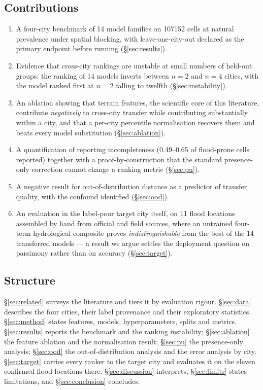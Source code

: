 \documentclass[11pt]{article}
\begin{document}
\subsection{Contributions}
\begin{enumerate}\itemsep2pt
  \item A four-city benchmark of \num{14} model families on \num{107152} cells at
    natural prevalence under spatial blocking, with leave-one-city-out declared
    as the primary endpoint before running (\S\ref{sec:results}).
  \item Evidence that cross-city rankings are unstable at small numbers of held-out
    groups: the ranking of \num{14} models inverts between $n{=}2$ and $n{=}4$
    cities, with the model ranked first at $n{=}2$ falling to twelfth
    (\S\ref{sec:instability}).
  \item An ablation showing that terrain features, the scientific core of this
    literature, contribute \emph{negatively} to cross-city transfer while
    contributing substantially within a city, and that a per-city percentile
    normalisation recovers them and beats every model substitution
    (\S\ref{sec:ablation}).
  \item A quantification of reporting incompleteness (\numrange{0.49}{0.65} of
    flood-prone cells reported) together with a proof-by-construction that the
    standard presence-only correction cannot change a ranking metric
    (\S\ref{sec:pu}).
  \item A negative result for out-of-distribution distance as a predictor of
    transfer quality, with the confound identified (\S\ref{sec:ood}).
  \item An evaluation in the label-poor target city itself, on \num{11} flood
    locations assembled by hand from official and field sources, where an
    untrained four-term hydrological composite proves \emph{indistinguishable}
    from the best of the \num{14} transferred models --- a result we argue
    settles the deployment question on parsimony rather than on accuracy
    (\S\ref{sec:target}).
\end{enumerate}

\subsection{Structure}
\S\ref{sec:related} surveys the literature and tiers it by evaluation rigour.
\S\ref{sec:data} describes the four cities, their label provenance and their
exploratory statistics. \S\ref{sec:method} states features, models,
hyperparameters, splits and metrics. \S\ref{sec:results} reports the benchmark
and the ranking instability; \S\ref{sec:ablation} the feature ablation and the
normalisation result; \S\ref{sec:pu} the presence-only analysis;
\S\ref{sec:ood} the out-of-distribution analysis and the error analysis by city.
\S\ref{sec:target} carries every ranker to the target city and evaluates it on
the eleven confirmed flood locations there. \S\ref{sec:discussion} interprets,
\S\ref{sec:limits} states limitations, and \S\ref{sec:conclusion} concludes.
\end{document}
